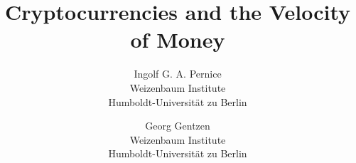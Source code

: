 %
%
% 


\title{\Large \bf Cryptocurrencies and the Velocity of Money}

\author{
	{\rm Ingolf G. A. Pernice}\\
	Weizenbaum Institute\\Humboldt-Universität zu Berlin
	\and
	{\rm Georg Gentzen}\\
	Weizenbaum Institute\\Humboldt-Universität zu Berlin
} %

%
\def \varInputTable {}
\def \varInputFigs  {}
\def \varInputAlgos {}

\newcommand{\parRemain}[1]{#1} %

